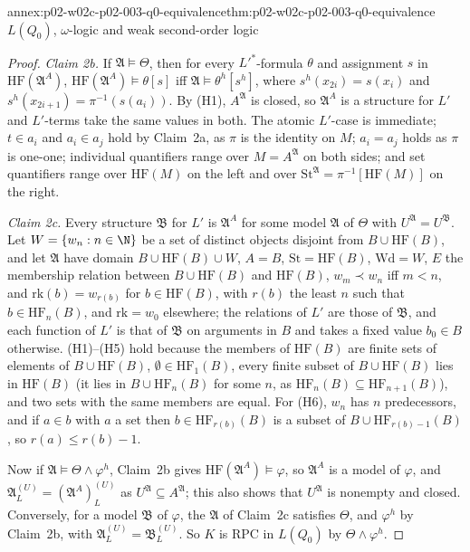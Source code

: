 \begin{annexitem}{annex:p02-w02c-p02-003-q0-equivalence}{thm:p02-w02c-p02-003-q0-equivalence}{\(L(Q_0)\), \(\omega\)-logic and weak second-order logic}
\begin{proof}
\emph{Claim 2b.}  If \(\mathfrak A\models\Theta\), then for every
\(L'^{*}\)-formula \(\theta\) and assignment \(s\) in
\(\mathrm{HF}(\mathfrak A^{A})\), \(\mathrm{HF}(\mathfrak A^{A})\models
\theta[s]\) iff \(\mathfrak A\models\theta^{h}[s^{h}]\), where
\(s^{h}(x_{2i})=s(x_i)\) and \(s^{h}(x_{2i+1})=\pi^{-1}(s(a_i))\).  By
(H1), \(A^{\mathfrak A}\) is closed, so \(\mathfrak A^{A}\) is a structure
for \(L'\) and \(L'\)-terms take the same values in both.  The atomic
\(L'\)-case is immediate; \(t\in a_i\) and \(a_i\in a_j\) hold by Claim~2a,
as \(\pi\) is the identity on \(M\); \(a_i=a_j\) holds as \(\pi\) is one-one;
individual quantifiers range over \(M=A^{\mathfrak A}\) on both sides; and
set quantifiers range over \(\mathrm{HF}(M)\) on the left and over
\(\mathrm{St}^{\mathfrak A}=\pi^{-1}[\mathrm{HF}(M)]\) on the right.

\emph{Claim 2c.}  Every structure \(\mathfrak B\) for \(L'\) is
\(\mathfrak A^{A}\) for some model \(\mathfrak A\) of \(\Theta\) with
\(U^{\mathfrak A}=U^{\mathfrak B}\).  Let \(W=\{w_n:n\in\N\}\) be a set of
distinct objects disjoint from \(B\cup\mathrm{HF}(B)\), and let
\(\mathfrak A\) have domain \(B\cup\mathrm{HF}(B)\cup W\), \(A=B\),
\(\mathrm{St}=\mathrm{HF}(B)\), \(\mathrm{Wd}=W\), \(E\) the membership
relation between \(B\cup\mathrm{HF}(B)\) and \(\mathrm{HF}(B)\),
\(w_m\prec w_n\) iff \(m<n\), and \(\mathrm{rk}(b)=w_{r(b)}\) for
\(b\in\mathrm{HF}(B)\), with \(r(b)\) the least \(n\) such that
\(b\in\mathrm{HF}_n(B)\), and \(\mathrm{rk}=w_0\) elsewhere; the relations of
\(L'\) are those of \(\mathfrak B\), and each function of \(L'\) is that of
\(\mathfrak B\) on arguments in \(B\) and takes a fixed value \(b_0\in B\)
otherwise.  (H1)--(H5) hold because the members of \(\mathrm{HF}(B)\) are
finite sets of elements of \(B\cup\mathrm{HF}(B)\), \(\emptyset\in
\mathrm{HF}_1(B)\), every finite subset of \(B\cup\mathrm{HF}(B)\) lies in
\(\mathrm{HF}(B)\) (it lies in \(B\cup\mathrm{HF}_n(B)\) for some \(n\), as
\(\mathrm{HF}_n(B)\subseteq\mathrm{HF}_{n+1}(B)\)), and two sets with the
same members are equal.  For (H6), \(w_n\) has \(n\) predecessors, and if
\(a\in b\) with \(a\) a set then \(b\in\mathrm{HF}_{r(b)}(B)\) is a subset of
\(B\cup\mathrm{HF}_{r(b)-1}(B)\), so \(r(a)\leq r(b)-1\).

Now if \(\mathfrak A\models\Theta\land\varphi^{h}\), Claim~2b gives
\(\mathrm{HF}(\mathfrak A^{A})\models\varphi\), so \(\mathfrak A^{A}\) is a
model of \(\varphi\), and \(\mathfrak A^{(U)}_{L}=(\mathfrak A^{A})^{(U)}_{L}\)
as \(U^{\mathfrak A}\subseteq A^{\mathfrak A}\); this also shows that
\(U^{\mathfrak A}\) is nonempty and closed.  Conversely, for a model
\(\mathfrak B\) of \(\varphi\), the \(\mathfrak A\) of Claim~2c satisfies
\(\Theta\), and \(\varphi^{h}\) by Claim~2b, with
\(\mathfrak A^{(U)}_{L}=\mathfrak B^{(U)}_{L}\).  So \(K\) is RPC in
\(L(Q_0)\) by \(\Theta\land\varphi^{h}\).


\end{proof}
\end{annexitem}

